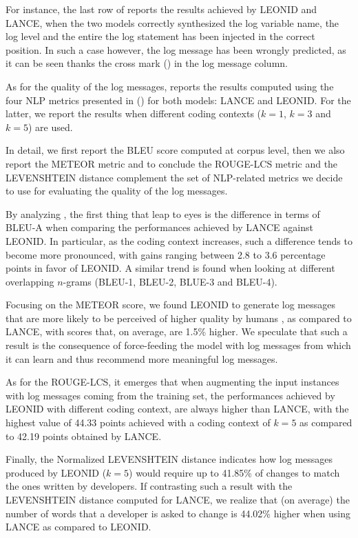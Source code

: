 For instance, the last row of  reports the results achieved by LEONID and LANCE, when the two models correctly synthesized the log variable name, the log level and the entire the log statement has been injected in the correct position. In such a case however, the log message has been wrongly predicted, as it can be seen thanks the cross mark (\xmark) in the log message column.





As for the quality of the log messages,  reports the results computed using the four NLP metrics presented in () for both models: LANCE and LEONID. For the latter, we report the results when different coding contexts (\ie $k=1$, $k=3$ and $k=5$) are used. 

In detail, we first report the BLEU score computed at corpus level, then we also report the METEOR metric and to conclude the ROUGE-LCS metric and the LEVENSHTEIN distance complement the set of NLP-related metrics we decide to use for evaluating the quality of the log messages.

By analyzing , the first thing that leap to eyes is the difference in terms of BLEU-A when comparing the performances achieved by LANCE against LEONID. In particular, as the coding context increases, such a difference tends to become more pronounced, with gains ranging between 2.8 to 3.6 percentage points in favor of LEONID. A similar trend is found when looking at different overlapping $n$-grams (\ie BLEU-1, BLEU-2, BLUE-3 and BLEU-4). 

Focusing on the METEOR score, we found LEONID to generate log messages that are more likely to be perceived of higher quality by humans \cite{meteor}, as compared to LANCE, with scores that, on average, are 1.5\% higher. We speculate that such a result is the consequence of force-feeding the model with log messages from which it can learn and thus recommend more meaningful log messages.

As for the ROUGE-LCS, it emerges that when augmenting the input instances with log messages coming from the training set, the performances achieved by LEONID with different coding context, are always higher than LANCE, with the highest value of 44.33 points achieved with a coding context of $k=5$ as compared to 42.19 points obtained by LANCE.

Finally, the Normalized LEVENSHTEIN distance indicates how log messages produced by LEONID ($k=5$) would require up to 41.85\% of changes to match the ones written by developers. If contrasting such a result with the LEVENSHTEIN distance computed for LANCE, we realize that (on average) the number of words that a developer is asked to change is 44.02\% higher when using LANCE as compared to LEONID.

